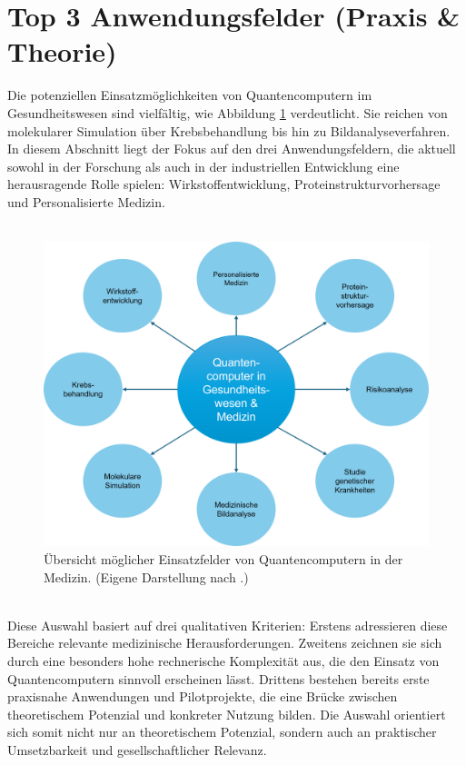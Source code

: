 \section{Top 3 Anwendungsfelder (Praxis \& Theorie)}
\label{med:applicationFields}
Die potenziellen Einsatzmöglichkeiten von Quantencomputern im Gesundheitswesen sind vielfältig, wie Abbildung \ref{fig:use-cases-medicine} verdeutlicht. Sie reichen von molekularer Simulation über Krebsbehandlung bis hin zu Bildanalyseverfahren. In diesem Abschnitt liegt der Fokus auf den drei Anwendungsfeldern, die aktuell sowohl in der Forschung als auch in der industriellen Entwicklung eine herausragende Rolle spielen: Wirkstoffentwicklung, Proteinstrukturvorhersage und Personalisierte Medizin.\\
\\
\begin{figure}[ht]
    \centering
    \includegraphics[width=.8\textwidth]{images/medicine/AnwendungsfelderMedizin.png}
    \caption{Übersicht möglicher Einsatzfelder von Quantencomputern in der Medizin. (Eigene Darstellung nach \cite{dhande_quantum_2023}.)}
    \label{fig:use-cases-medicine}
\end{figure}
\\
Diese Auswahl basiert auf drei qualitativen Kriterien: Erstens adressieren diese Bereiche relevante medizinische Herausforderungen. Zweitens zeichnen sie sich durch eine besonders hohe rechnerische Komplexität aus, die den Einsatz von Quantencomputern sinnvoll erscheinen lässt. Drittens bestehen bereits erste praxisnahe Anwendungen und Pilotprojekte, die eine Brücke zwischen theoretischem Potenzial und konkreter Nutzung bilden. Die Auswahl orientiert sich somit nicht nur an theoretischem Potenzial, sondern auch an praktischer Umsetzbarkeit und gesellschaftlicher Relevanz.

